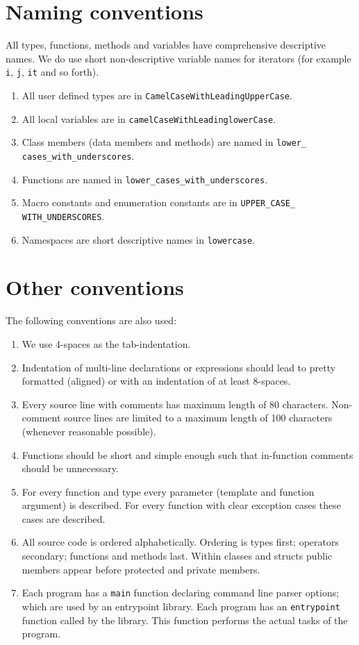 \documentclass{article}
\begin{document}
\section{Naming conventions}
All types, functions, methods and variables have comprehensive descriptive names. We do use short non-descriptive variable names for iterators (for example {\tt i}, {\tt j}, {\tt it} and so forth).
\begin{enumerate}
    \item All user defined types are in {\tt CamelCaseWithLeadingUpperCase}.
    \item All local variables are in {\tt camelCaseWithLeadinglowerCase}.
    \item Class members (data members and methods) are named in {\tt lower\_\\cases\_with\_underscores}.
    \item Functions are named in {\tt lower\_cases\_with\_underscores}.
    \item Macro constants and enumeration constants are in {\tt UPPER\_CASE\_\\WITH\_UNDERSCORES}.
    \item Namespaces are short descriptive names in {\tt lowercase}.
\end{enumerate}

\section{Other conventions}
The following conventions are also used:
\begin{enumerate}
    \item We use 4-spaces as the tab-indentation.
    \item Indentation of multi-line declarations or expressions should lead to pretty formatted (aligned) or with an indentation of at least 8-spaces.
    \item Every source line with comments has maximum length of 80 characters. Non-comment source lines are limited to a maximum length of 100 characters (whenever reasonable possible).
    \item Functions should be short and simple enough such that in-function comments should be unnecessary.
    \item For every function and type every parameter (template and function argument) is described. For every function with clear exception cases these cases are described.
   \item All source code is ordered alphabetically. Ordering is types first; operators secondary; functions and methods last. Within classes and structs public members appear before protected and private members.
    \item Each program has a {\tt main} function declaring command line parser options; which are used by an entrypoint library. Each program has an {\tt entrypoint} function called by the library. This function performs the actual tasks of the program.
\end{enumerate}
\end{document}
